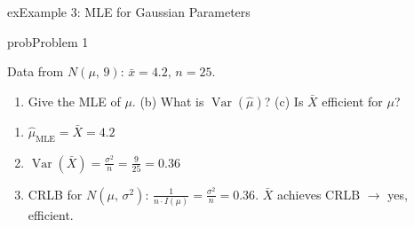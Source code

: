 \begin{PSbox}[unbreakable]{ex}{Example 3: MLE for Gaussian Parameters}
\begin{Shaded}
\begin{Highlighting}[]
\NormalTok{(}\OperatorTok{,} \NormalTok{(}\NormalTok{)}\OperatorTok{,} \OperatorTok{,} \NormalTok{(}\NormalTok{))}\OperatorTok{;}
\NormalTok{(}\OperatorTok{,} \NormalTok{(}\NormalTok{)}\OperatorTok{,} \NormalTok{)}\OperatorTok{;}
\NormalTok{(}\OperatorTok{,} \NormalTok{(}\NormalTok{)}\OperatorTok{,} \NormalTok{)}\OperatorTok{;}
\end{Highlighting}
\end{Shaded}

\end{PSbox}


\begin{PSbox}[unbreakable]{prob}{Problem 1}

Data from $N(\mu,\, 9)$: $\bar{x} = 4.2,\, n = 25$.

\begin{enumerate}
\def\labelenumi{(\alph{enumi})}
\tightlist
\item
  Give the MLE of $\mu$. (b) What is $\operatorname{Var}(\hat{\mu})$? (c) Is $\bar{X}$ efficient for $\mu$?
\end{enumerate}

\PSsolution{} 

\begin{enumerate}
\def\labelenumi{(\alph{enumi})}
\tightlist
\item
  $\hat{\mu}_{\mathrm{MLE}} = \bar{X} = 4.2$
\item
  $\displaystyle \operatorname{Var}(\bar{X}) = \frac{\sigma^{2}}{n} = \frac{9}{25} = 0.36$
\item
  CRLB for $N(\mu,\,\sigma^{2})$: $\frac{1}{n \cdot I(\mu)} = \frac{\sigma^{2}}{n} = 0.36$. $\bar{X}$ achieves $\mathrm{CRLB}$ \ensuremath{\to} yes, efficient.
\end{enumerate}

\end{PSbox}


